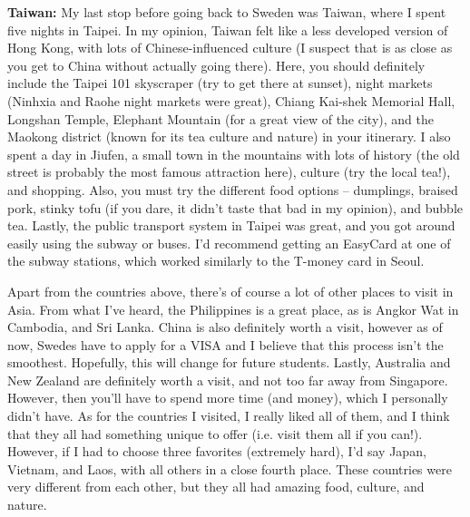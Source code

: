 \textbf{Taiwan:} My last stop before going back to Sweden was Taiwan, where I spent five nights in Taipei. In my opinion, Taiwan felt like a less developed version of Hong Kong, with lots of Chinese-influenced culture (I suspect that is as close as you get to China without actually going there). Here, you should definitely include the Taipei 101 skyscraper (try to get there at sunset), night markets (Ninhxia and Raohe night markets were great), Chiang Kai-shek Memorial Hall, Longshan Temple, Elephant Mountain (for a great view of the city), and the Maokong district (known for its tea culture and nature) in your itinerary. I also spent a day in Jiufen, a small town in the mountains with lots of history (the old street is probably the most famous attraction here), culture (try the local tea!), and shopping. Also, you must try the different food options -- dumplings, braised pork, stinky tofu (if you dare, it didn't taste that bad in my opinion), and bubble tea. Lastly, the public transport system in Taipei was great, and you got around easily using the subway or buses. I'd recommend getting an EasyCard at one of the subway stations, which worked similarly to the T-money card in Seoul.

\vspace{-0.25cm}
\hrulefill

Apart from the countries above, there's of course a lot of other places to visit in Asia. From what I've heard, the Philippines is a great place, as is Angkor Wat in Cambodia, and Sri Lanka. China is also definitely worth a visit, however as of now, Swedes have to apply for a VISA and I believe that this process isn't the smoothest. Hopefully, this will change for future students. Lastly, Australia and New Zealand are definitely worth a visit, and not too far away from Singapore. However, then you'll have to spend more time (and money), which I personally didn't have. As for the countries I visited, I really liked all of them, and I think that they all had something unique to offer (i.e. visit them all if you can!). However, if I had to choose three favorites (extremely hard), I'd say Japan, Vietnam, and Laos, with all others in a close fourth place. These countries were very different from each other, but they all had amazing food, culture, and nature.
